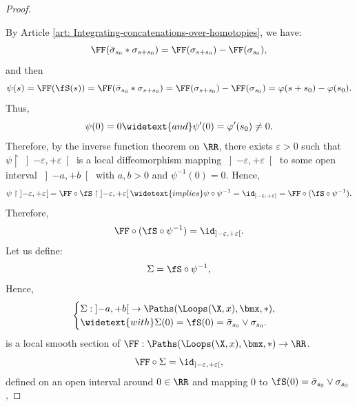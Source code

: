 \begin{proof}
    \begin{center}
    \end{center}
    
    By Article \ref{art: Integrating-concatenations-over-homotopies}, we have:
    $$
      \FF(\bar\sigma_{s_0} * \sigma_{s+s_0}) = \FF(\sigma_{s+s_0}) - \FF(\sigma_{s_0}),
      $$
    and then
    $$
      \psi(s) = \FF(\fS(s)) = \FF(\bar\sigma_{s_0} * \sigma_{s+s_0}) = \FF(\sigma_{s+s_0}) - \FF(\sigma_{s_0}) = \varphi(s + s_0) - \varphi(s_0).
      $$
    Thus,
    $$
      \psi(0) = 0
      \widetext{and}
      \psi'(0) = \varphi'(s_0) \neq 0.
      $$
    Therefore,
    by the inverse function theorem on $\RR$,
    there exists $\varepsilon > 0$ such that $\psi \restriction \left]- \varepsilon,+ \varepsilon \right[$ is a local diffeomorphism mapping $\left]- \varepsilon,+ \varepsilon \right[$ to some open interval $\left]-a,+ b \right[$ with $a,b>0$ and $\psi^{-1}(0) = 0$.
    Hence,
    $$
      \psi \restriction  \left]- \varepsilon,+ \varepsilon \right[ = \FF \circ \fS \restriction  \left]- \varepsilon,+ \varepsilon \right[
      \widetext{implies}
      \psi \circ \psi^{-1} = \id_{\left]- \varepsilon,+ \varepsilon \right[} = \FF \circ (\fS \circ \psi^{-1}).
      $$
    Therefore,
    $$
      \FF \circ (\fS \circ \psi^{-1}) =\id_{\left]- \varepsilon,+ \varepsilon \right[}.
      $$
    Let us define:
    $$
      \Sigma = \fS \circ \psi^{-1},
      $$
    Hence,
    $$
      \begin{cases}
      \Sigma  : \left]-a,+ b \right[ \to \Paths(\Loops(\X,x),\bmx,\ast), \\
      \widetext{with}
      \Sigma(0) = \fS(0) = \bar\sigma_{s_0} \vee \sigma_{s_0}.
      \end{cases}
      $$
    is a local smooth section of $\FF : \Paths(\Loops(\X,x),\bmx,\ast) \to \RR$.
    $$
      \FF \circ \Sigma = \id_{\left]- \varepsilon,+ \varepsilon \right[},
      $$
    defined on an open interval around $0 \in \RR$ and mapping $0$ to $\fS(0) = \bar\sigma_{s_0} \vee \sigma_{s_0}$,

\end{proof}
